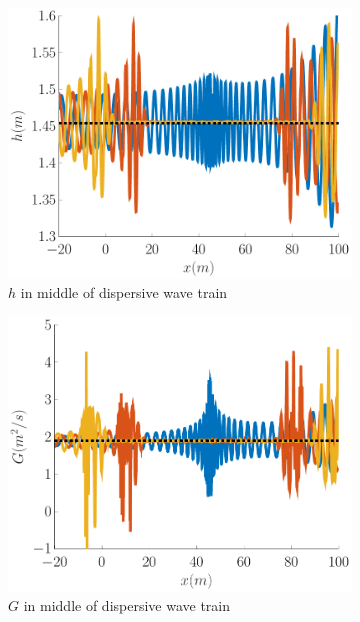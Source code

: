 \documentclass[10pt]{article}
\begin{document}
\begin{figure}
	\centering
	\begin{subfigure}{0.32\textwidth}
		\centering
		\includegraphics[width=\textwidth]{./Figures/Simulations/Study/ImpDisp/hMiddle.pdf}
		\caption{$h$ in middle of dispersive wave train}
	\end{subfigure}
	\begin{subfigure}{0.32\textwidth}
		\centering
		\includegraphics[width=\textwidth]{./Figures/Simulations/Study/ImpDisp/GMiddle.pdf}
		\caption{$G$ in middle of dispersive wave train}
	\end{subfigure}
	\begin{subfigure}{0.32\textwidth}

\end{subfigure}
\end{figure}
\end{document}
